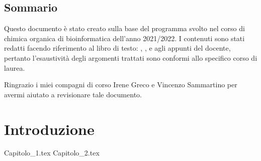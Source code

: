 \documentclass[
    a4paper,
    12pt,
    oneside,
    ]{book} %
\begin{document}
\frontmatter




\chapter*{Sommario}
Questo documento è stato creato sulla base del programma svolto nel corso di chimica organica di bioinformatica dell'anno 2021/2022. I contenuti sono stati redatti facendo riferimento al libro di testo: \cite{brown2014introduzione}, \cite{hart2008chimica}, \cite{pianetaChimica}  e agli appunti del docente, pertanto l'esaustività degli argomenti trattati sono conformi allo specifico corso di laurea.

Ringrazio i miei compagni di corso Irene Greco e Vincenzo Sammartino per avermi aiutato a revisionare tale documento.


\begingroup
{}
\hypersetup{hidelinks} %
\fancyhead[LO]{ }
\tableofcontents %

\listofreactions %

\listoffigures %
\fancyhead[LO]{\textsc{\leftmark}}
\listoftables %
\thispagestyle{empty}
\endgroup

\mainmatter


\part{Introduzione}
{Capitolo_1.tex} %
{Capitolo_2.tex} %

\end{document}
